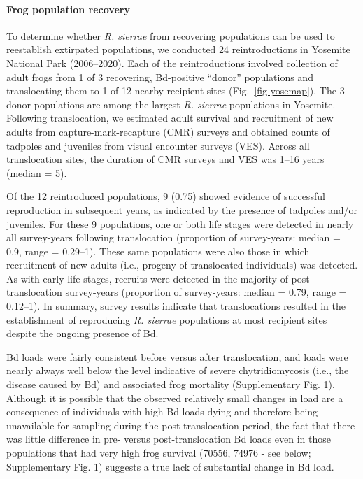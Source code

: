 \documentclass[
  letterpaper,
  DIV=11,
  numbers=noendperiod]{scrartcl}
\let\oldparagraph\paragraph
\renewcommand{\paragraph}[1]{\oldparagraph{#1}\mbox{}}
\begin{document}
\paragraph{Frog population recovery}\label{frog-population-recovery}

To determine whether \emph{R. sierrae} from recovering populations can
be used to reestablish extirpated populations, we conducted 24
reintroductions in Yosemite National Park (2006--2020). Each of the
reintroductions involved collection of adult frogs from 1 of 3
recovering, Bd-positive ``donor'' populations and translocating them to
1 of 12 nearby recipient sites (Fig.~\ref{fig-yosemap}). The 3 donor
populations are among the largest \emph{R. sierrae} populations in
Yosemite. Following translocation, we estimated adult survival and
recruitment of new adults from capture-mark-recapture (CMR) surveys and
obtained counts of tadpoles and juveniles from visual encounter surveys
(VES). Across all translocation sites, the duration of CMR surveys and
VES was 1--16 years (median = 5).

Of the 12 reintroduced populations, 9 (0.75) showed evidence of
successful reproduction in subsequent years, as indicated by the
presence of tadpoles and/or juveniles. For these 9 populations, one or
both life stages were detected in nearly all survey-years following
translocation (proportion of survey-years: median = 0.9, range =
0.29--1). These same populations were also those in which recruitment of
new adults (i.e., progeny of translocated individuals) was detected. As
with early life stages, recruits were detected in the majority of
post-translocation survey-years (proportion of survey-years: median =
0.79, range = 0.12--1). In summary, survey results indicate that
translocations resulted in the establishment of reproducing \emph{R.
sierrae} populations at most recipient sites despite the ongoing
presence of Bd.

Bd loads were fairly consistent before versus after translocation, and
loads were nearly always well below the level indicative of severe
chytridiomycosis (i.e., the disease caused by Bd) and associated frog
mortality \citep{joseph2018, vredenburg2010} (Supplementary Fig. 1).
Although it is possible that the observed relatively small changes in
load are a consequence of individuals with high Bd loads dying and
therefore being unavailable for sampling during the post-translocation
period, the fact that there was little difference in pre- versus
post-translocation Bd loads even in those populations that had very high
frog survival (70556, 74976 - see below; Supplementary Fig. 1) suggests
a true lack of substantial change in Bd load.
\end{document}
